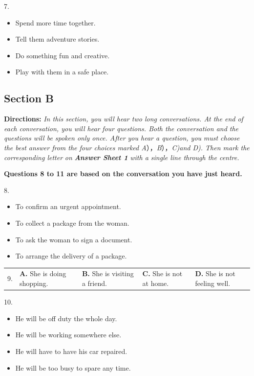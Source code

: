 \documentclass[UTF8,11pt]{ctexart}
\begin{document}
7.


\begin{itemize}[leftmargin=2em,itemsep=.2em,topsep=.4em]\item[A.] Spend more time together.
\item[B.] Tell them adventure stories.
\item[C.] Do something fun and creative.
\item[D.] Play with them in a safe place.
\end{itemize}

\subsection*{\textbf{Section B}}


\textbf{Directions:}\textit{ In this section, you will hear two long conversations. At the end of each conversation, you will hear} \textit{four questions. Both the conversation and the questions will be spoken only once. After you hear a question, you} \textit{must choose the best answer from the four choices marked A}），\textit{B}），\textit{C)and D). Then mark the corresponding letter} \textit{on}\textbf{\textit{ Answer Sheet 1}}\textit{ with a single line through the centre.}


\textbf{Questions 8 to 11 are based on the conversation you have just heard.}


8.


\begin{itemize}[leftmargin=2em,itemsep=.2em,topsep=.4em]\item[A.] To confirm an urgent appointment.
\item[B.] To collect a package from the woman.
\item[C.] To ask the woman to sign a document.
\item[D.] To arrange the delivery of a package.
\end{itemize}

\noindent\begin{tabularx}{\linewidth}{@{}lXXXX@{}}9. & \textbf{A.} She is doing shopping. & \textbf{B.} She is visiting a friend. & \textbf{C.} She is not at home. & \textbf{D.} She is not feeling well.\\\end{tabularx}\par

10.


\begin{itemize}[leftmargin=2em,itemsep=.2em,topsep=.4em]\item[A.] He will be off duty the whole day.
\item[B.] He will be working somewhere else.
\item[C.] He will have to have his car repaired.
\item[D.] He will be too busy to spare any time.
\end{itemize}
\end{document}
